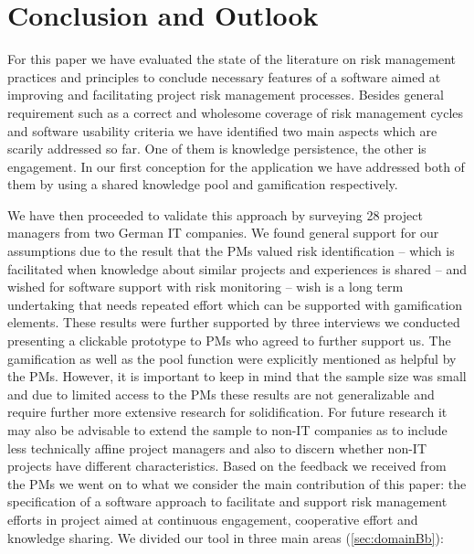 \chapter{Conclusion and Outlook}
\label{ch:conclusionoutlookB}

For this paper we have evaluated the state of the literature on risk management practices and principles to conclude necessary features of a software aimed at improving and facilitating project risk management processes. Besides general requirement such as a correct and wholesome coverage of risk management cycles and software usability criteria we have identified two main aspects which are scarily addressed so far. One of them is knowledge persistence, the other is engagement. In our first conception for the application we have addressed both of them by using a shared knowledge pool and gamification respectively.

We have then proceeded to validate this approach by surveying 28 project managers from two German IT companies. We found general support for our assumptions due to the result that the PMs valued risk identification – which is facilitated when knowledge about similar projects and experiences is shared – and wished for software support with risk monitoring – wish is a long term undertaking that needs repeated effort which can be supported with gamification elements. These results were further supported by three interviews we conducted presenting a clickable prototype to PMs who agreed to further support us. The gamification as well as the pool function were explicitly mentioned as helpful by the PMs. However, it is important to keep in mind that the sample size was small and due to limited access to the PMs these results are not generalizable and require further more extensive research for solidification. For future research it may also be advisable to extend the sample to non-IT companies as to include less technically affine project managers and also to discern whether non-IT projects have different characteristics.
Based on the feedback we received from the PMs we went on to what we consider the main contribution of this paper: the specification of a software approach to facilitate and support risk management efforts in project aimed at continuous engagement, cooperative effort and knowledge sharing. We divided our tool in three main areas (\ref{sec:domainBb}): 

